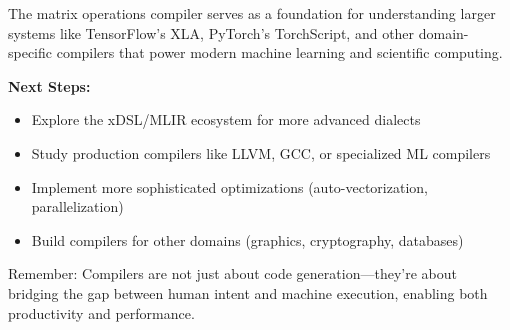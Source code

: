 \documentclass[11pt,a4paper]{article}
\begin{document}
The matrix operations compiler serves as a foundation for understanding larger systems like TensorFlow's XLA, PyTorch's TorchScript, and other domain-specific compilers that power modern machine learning and scientific computing.

\textbf{Next Steps:}
\begin{itemize}
    \item Explore the xDSL/MLIR ecosystem for more advanced dialects
    \item Study production compilers like LLVM, GCC, or specialized ML compilers
    \item Implement more sophisticated optimizations (auto-vectorization, parallelization)
    \item Build compilers for other domains (graphics, cryptography, databases)
\end{itemize}

Remember: Compilers are not just about code generation—they're about bridging the gap between human intent and machine execution, enabling both productivity and performance.
\end{document}
